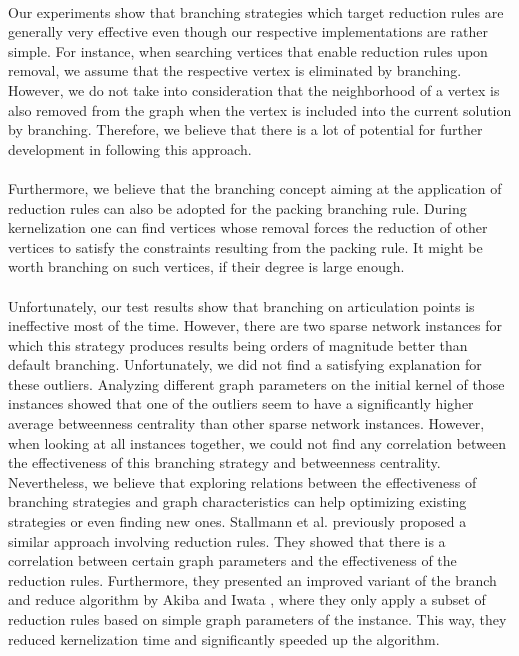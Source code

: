 \documentclass[12pt,a4paper,twoside]{scrartcl}
\numberwithin{equation}{section}
\begin{document}
\paragraph{}
Our experiments show that branching strategies which target reduction rules are generally very effective even though our respective implementations are rather simple. For instance, when searching vertices that enable reduction rules upon removal, we assume that the respective vertex is eliminated by branching. However, we do not take into consideration that the neighborhood of a vertex is also removed from the graph when the vertex is included into the current solution by branching. Therefore, we believe that there is a lot of potential for further development in following this approach.

\paragraph{}
Furthermore, we believe that the branching concept aiming at the application of reduction rules can also be adopted for the packing branching rule. During kernelization one can find vertices whose removal forces the reduction of other vertices to satisfy the constraints resulting from the packing rule. It might be worth branching on such vertices, if their degree is large enough.

\paragraph{}
Unfortunately, our test results show that branching on articulation points is ineffective most of the time. However, there are two sparse network instances for which this strategy produces results being orders of magnitude better than default branching. Unfortunately, we did not find a satisfying explanation for these outliers. Analyzing different graph parameters on the initial kernel of those instances showed that one of the outliers seem to have a significantly higher average betweenness centrality than other sparse network instances. However, when looking at all instances together, we could not find any correlation between the effectiveness of this branching strategy and betweenness centrality. Nevertheless, we believe that exploring relations between the effectiveness of branching strategies and graph characteristics can help optimizing existing strategies or even finding new ones. Stallmann et al. \cite{Stallmann} previously proposed a similar approach involving reduction rules. They showed that there is a correlation between certain graph parameters and the effectiveness of the reduction rules. Furthermore, they presented an improved variant of the branch and reduce algorithm by Akiba and Iwata \cite{AkibaIwata}, where they only apply a subset of reduction rules based on simple graph parameters of the instance. This way, they reduced kernelization time and significantly speeded up the algorithm.
\end{document}
